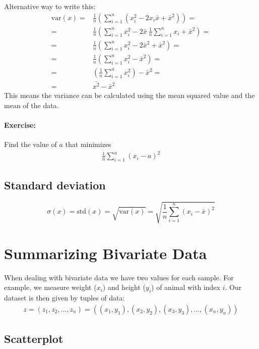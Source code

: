 Alternative way to write this:
\begin{align}
\text{var}(x) =& \frac{1}{n}\left(\sum_{i=1}^{n}(x_{i}^2 - 2x_{i}\bar{x}+\bar{x}^2)  \right) =\\
         =& \frac{1}{n}\left(\sum_{i=1}^{n} x_{i}^2 - 2\bar{x} \ \frac{1}{n}\sum_{i=1}^{n}x_{i}+\bar{x}^2 \right) =\\
         =& \frac{1}{n}\left(\sum_{i=1}^{n} x_{i}^2 - 2\bar{x}^2+\bar{x}^2 \right) =\\
         =& \frac{1}{n}\left(\sum_{i=1}^{n} x_{i}^2 - \bar{x}^2 \right) = \\ 
         =& \left(\frac{1}{n} \sum_{i=1}^{n} x_{i}^2 \right) - \bar{x}^2  = \\ 
         =& \bar{x^2} - \bar{x}^2
\end{align}
This means the variance can be calculated using the mean squared value and the mean of the data.

\paragraph{Exercise:} Find the value of $a$ that minimizes 
\begin{align}
\frac{1}{n}\sum_{i=1}^{n}(x_{i}-a)^2
\end{align}


\subsection {Standard deviation}

\begin{equation*}
\sigma(x) = \text{std}(x) = \sqrt{\text{var}(x)} =\sqrt{\frac{1}{n}\sum_{i=1}^{n}(x_{i}-\bar{x})^2}
\end{equation*}


\section{Summarizing Bivariate Data}
When dealing with bivariate data we have two values for each sample.
For example, we measure weight ($x_i$) and height ($y_i$) of animal with index $i$.
Our dataset is then given by tuples of data:
\begin{align}
  z = (z_{1},z_{2},\ldots,z_{n}) =((x_{1},y_{1}),(x_{2},y_{2}),(x_{3},y_{3}),\ldots,(x_{n},y_{n}))
\end{align}

\subsection{Scatterplot}
    
